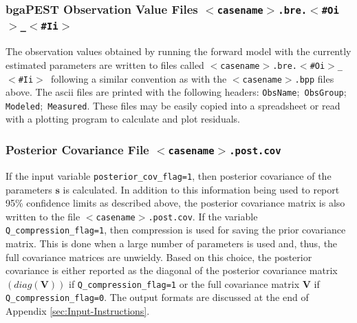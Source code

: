 \documentclass[11pt,oneside,onecolumn]{usgsreport}
\begin{document}
\begin{multicols}{2}
\begin{bibunit}
\subsubsection{bgaPEST Observation Value Files \texttt{$<$casename$>$.bre.$<$\#Oi$>$\_$<$\#Ii$>$}}

The observation values obtained by running the forward model with
the currently estimated parameters are written to files called \texttt{$<$casename$>$.bre.$<$\#Oi$>$\_$<$\#Ii$>$
}following a similar convention as with the \texttt{$<$casename$>$.bpp}
files above. The ascii files are printed with the following headers:
\texttt{ObsName};\texttt{ ObsGroup};\texttt{ Modeled};\texttt{ Measured}.
These files may be easily copied into a spreadsheet or read with a
plotting program to calculate and plot residuals.


\subsubsection{Posterior Covariance File \texttt{$<$casename$>$.post.cov}}

If the input variable \texttt{posterior\_cov\_flag=1}, then posterior
covariance of the parameters $\mathbf{s}$ is calculated. In addition
to this information being used to report 95\% confidence limits as
described above, the posterior covariance matrix is also written to
the file \texttt{$<$casename$>$.post.cov}. If the variable \texttt{Q\_compression\_flag=1},
then compression is used for saving the prior covariance matrix. This
is done when a large number of parameters is used and, thus, the full
covariance matrices are unwieldy. Based on this choice, the posterior
covariance is either reported as the diagonal of the posterior covariance
matrix $\left(diag\left(\mathbf{V}\right)\right)$ if \texttt{Q\_compression\_flag=1}
or the full covariance matrix $\mathbf{V}$ if \texttt{Q\_compression\_flag=0}.
The output formats are discussed at the end of Appendix \ref{sec:Input-Instructions}.

\end{bibunit}
\end{multicols}
\end{document}
